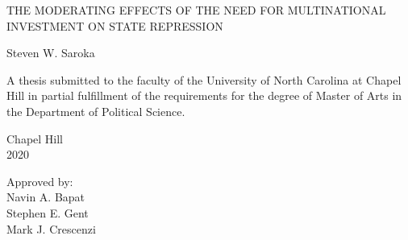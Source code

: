 \begin{titlepage}
\begin{center}


\vspace{2in}
\begin{singlespace}

THE MODERATING EFFECTS OF THE NEED FOR MULTINATIONAL INVESTMENT ON STATE REPRESSION
 \end{singlespace}


\vspace{61pt} %
\large Steven W. Saroka
\end{center}



\vspace{50pt}
\begin{singlespace}
\noindent \large
A thesis submitted to the faculty of the University of North Carolina at Chapel Hill
in partial fulfillment of the requirements for the degree of Master of Arts in
the Department of Political Science.
\end{singlespace}


\vspace{50pt}
\begin{center}
\begin{singlespace} \large
Chapel Hill\\
2020
\end{singlespace}
\end{center}


\vspace{50pt}
\begin{flushright}
\begin{minipage}{1.4in} \large
Approved by:\\
Navin A. Bapat \\
Stephen E. Gent \\
Mark J. Crescenzi \\
\end{minipage}
\end{flushright}

\end{titlepage}